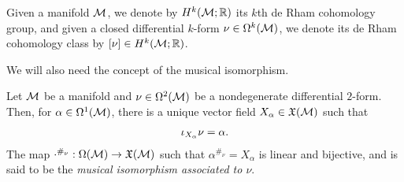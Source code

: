 \documentclass[notas.tex]{subfiles}
\begin{document}


Given a manifold $\mathcal{M}$, we denote by $H^k(\mathcal{M}; \mathbb{R})$ its $k$th de Rham cohomology group, and given a closed differential $k$-form $\nu \in \Omega^k(\mathcal{M})$, we denote its de Rham cohomology class by $\left[ \nu \right] \in H^k(\mathcal{M}; \mathbb{R})$.





We will also need the concept of the musical isomorphism.
\begin{prop}\label{prop_musical_iso}
	Let $\mathcal{M}$ be a manifold and $\nu \in \Omega^2(\mathcal{M})$ be a nondegenerate differential $2$-form. Then, for $\alpha \in \Omega^1(\mathcal{M})$, there is a unique vector field $X_\alpha \in \mathfrak{X}(\mathcal{M})$ such that 
	\begin{align*}
		\iota_{X_\alpha}\nu = \alpha.
	\end{align*}  
	The map $\cdot^{\#_\nu}: \Omega(\mathcal{M}) \to \mathfrak{X}(\mathcal{M})$ such that $\alpha^{\#_\nu} = X_\alpha$ is linear and bijective, and is said to be the \emph{musical isomorphism associated to $\nu$}.
\end{prop}
\end{document}
